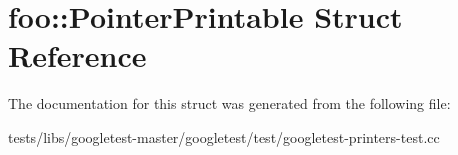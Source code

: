 \hypertarget{structfoo_1_1PointerPrintable}{}\section{foo\+:\+:Pointer\+Printable Struct Reference}
\label{structfoo_1_1PointerPrintable}


The documentation for this struct was generated from the following file\+:\begin{DoxyCompactItemize}
\item 
tests/libs/googletest-\/master/googletest/test/googletest-\/printers-\/test.\+cc\end{DoxyCompactItemize}
